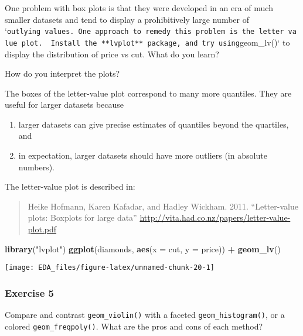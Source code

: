 \documentclass[]{book}
\newenvironment{Shaded}{\begin{snugshade}}{\end{snugshade}}
\newcommand{\DataTypeTok}[1]{\textcolor[rgb]{0.13,0.29,0.53}{#1}}
\newcommand{\KeywordTok}[1]{\textcolor[rgb]{0.13,0.29,0.53}{\textbf{#1}}}
\newcommand{\NormalTok}[1]{#1}
\newcommand{\OperatorTok}[1]{\textcolor[rgb]{0.81,0.36,0.00}{\textbf{#1}}}
\newcommand{\StringTok}[1]{\textcolor[rgb]{0.31,0.60,0.02}{#1}}
\providecommand{\tightlist}{%
  \setlength{\itemsep}{0pt}\setlength{\parskip}{0pt}}
\theoremstyle{definition}
\theoremstyle{definition}
\theoremstyle{definition}
\theoremstyle{remark}
\begin{document}
One problem with box plots is that they were developed in an era of much
smaller datasets and tend to display a prohibitively large number of
`\texttt{outlying\ values\textquotesingle{}\textquotesingle{}.\ One\ approach\ to\ remedy\ this\ problem\ is\ the\ letter\ value\ plot.\ \ Install\ the\ **lvplot**\ package,\ and\ try\ using}geom\_lv()`
to display the distribution of price vs cut. What do you learn?

How do you interpret the plots?

The boxes of the letter-value plot correspond to many more quantiles.
They are useful for larger datasets because

\begin{enumerate}
\def\labelenumi{\arabic{enumi}.}
\tightlist
\item
  larger datasets can give precise estimates of quantiles beyond the
  quartiles, and
\item
  in expectation, larger datasets should have more outliers (in absolute
  numbers).
\end{enumerate}

The letter-value plot is described in:

\begin{quote}
Heike Hofmann, Karen Kafadar, and Hadley Wickham. 2011. ``Letter-value
plots: Boxplots for large data''
\url{http://vita.had.co.nz/papers/letter-value-plot.pdf}
\end{quote}

\begin{Shaded}
\begin{Highlighting}[]
\KeywordTok{library}\NormalTok{(}\StringTok{"lvplot"}\NormalTok{)}
\KeywordTok{ggplot}\NormalTok{(diamonds, }\KeywordTok{aes}\NormalTok{(}\DataTypeTok{x =}\NormalTok{ cut, }\DataTypeTok{y =}\NormalTok{ price)) }\OperatorTok{+}
\StringTok{  }\KeywordTok{geom_lv}\NormalTok{()}
\end{Highlighting}
\end{Shaded}

\begin{center}\texttt{[image: EDA\_files/figure-latex/unnamed-chunk-20-1]} \end{center}

\hypertarget{exercise-5-3}{%
\subsubsection{Exercise 5}\label{exercise-5-3}}

Compare and contrast \texttt{geom\_violin()} with a faceted
\texttt{geom\_histogram()}, or a colored \texttt{geom\_freqpoly()}. What
are the pros and cons of each method?
\end{document}
